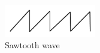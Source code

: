 \begin{figure}[H]
  \centering
  \includegraphics[clip, trim=0cm 0cm 0cm 0cm, width=4cm]{fig/sawtooth.pdf}
  \caption{Sawtooth wave}
\end{figure}
